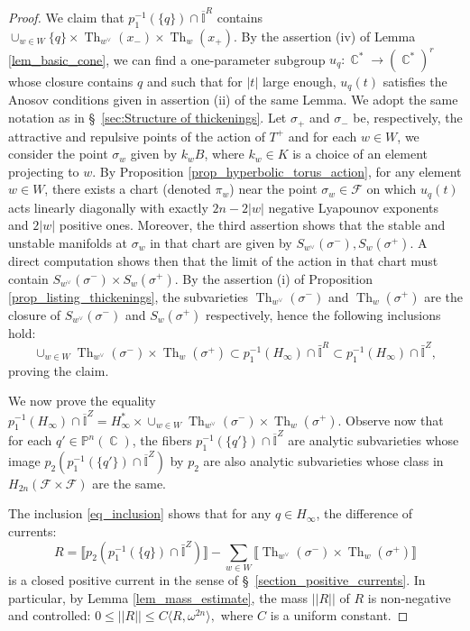 \documentclass[12pt]{amsbook}%
\theoremstyle{definition}
\theoremstyle{remark}
\numberwithin{section}{chapter}
\numberwithin{subsection}{section}
\numberwithin{figure}{chapter}
\DeclareMathOperator{\C}{\mathbb{C}}
\DeclareMathOperator{\Th}{Th}
\DeclareMathOperator{\R}{\mathbb{R}}
\newcommand\intcur[1]{\llbracket #1 \rrbracket}
\def\bP{{\mathbb{P}}}
\def\cF{{\mathscr{F}}}
\begin{document}
{{\begin{proof}
\smallskip
 We claim that $p_1^{-1} (\{ q\}) \cap  \overline{\mathbb{I}}^R$ contains $\cup_{w\in W} \{ q\} \times \Th_{w^\vee}(x_-) \times \Th_w(x_+)  $. 
 By the assertion (iv) of Lemma \ref{lem_basic_cone}, we can find a one-parameter subgroup $u_q \colon \C^* \to  (\C^*)^r$ whose closure contains $q$ and such that for $|t|$ large enough, $u_q(t)$ satisfies the Anosov conditions given in assertion (ii) of the same Lemma. 
We adopt the same notation as in \S~\ref{sec:Structure of thickenings}. Let $\sigma_+$ and $\sigma_-$ be, respectively, the attractive and repulsive points of the action of $T^+$ and for each $w \in W$, we consider the point $\sigma_w$ given by $k_w B$, 
where $k_w \in K$ is a choice of an element projecting to $w$. 
By Proposition \ref{prop_hyperbolic_torus_action}, for any element $w \in W$,  there exists a chart (denoted $\pi_w$) near the point $\sigma_w  \in \cF$ on which $u_q(t)$ acts linearly diagonally with exactly $ 2n - 2|w|$ negative Lyapounov exponents and $2 |w|$ positive ones. Moreover, the third assertion  shows that the stable and unstable manifolds at $\sigma_w$ in that chart are given by $S_{w^\vee}(\sigma^-) , S_w(\sigma^+)$. A direct computation shows then that the limit of the action in that chart must contain   $S_{w^\vee}(\sigma^-) \times S_w(\sigma^+)$. By the assertion (i)  of Proposition \ref{prop_listing_thickenings}, the subvarieties $\Th_{w^\vee}(\sigma^-)$ and $\Th_w(\sigma^+)$ are the closure of $S_{w^\vee}(\sigma^-)$ and $S_{w}(\sigma^+) $ respectively, hence the following  inclusions hold: 
\begin{equation} \label{eq_inclusion}
\cup_{w \in W} \Th_{w^\vee}(\sigma^-) \times \Th_w(\sigma^+) \subset  p_1^{-1}(H_\infty) \cap \bar{\mathbb{I}}^R \subset p_1^{-1}(H_\infty) \cap  \bar{\mathbb{I}}^Z,
\end{equation}
proving the claim. 

\smallskip

We now prove the equality  $p_1^{-1} (H_\infty) \cap \overline{\mathbb{I}}^Z =  H_\infty^* \times \cup_{w \in W} \Th_{w^\vee}(\sigma^-) \times \Th_w(\sigma^+) $.
Observe now that for each $q' \in \bP^n(\C)$, the  fibers $p_1^{-1} (\{ q'\}) \cap \overline{\mathbb{I}}^Z$ are analytic subvarieties whose image $p_2(p_1^{-1} (\{ q'\}) \cap \overline{\mathbb{I}}^Z) $ by $p_2$ are also analytic subvarieties whose class in $H_{2n}(\cF \times \cF)$ are the same.

The inclusion \eqref{eq_inclusion} shows  that for any $q \in H_\infty$, the difference of currents: 
\begin{equation*} 
R =	\intcur{p_2 (p_1^{-1}(\{q\}) \cap \bar{\mathbb{I}}^Z)} - \sum_{w\in W} \intcur{\Th_{w^\vee}(\sigma^-) \times \Th_w(\sigma^+)}
\end{equation*}
is a closed positive current  in the sense of \S~\ref{section_positive_currents}.
In particular, by Lemma \ref{lem_mass_estimate}, the mass $|| R||$ of $R$ is non-negative and controlled: 
$ 0 \leqslant 	||R|| \leqslant C \langle R , \omega^{2n} \rangle,  
$ where $C$ is a uniform constant. 


\end{proof}}}
\end{document}
